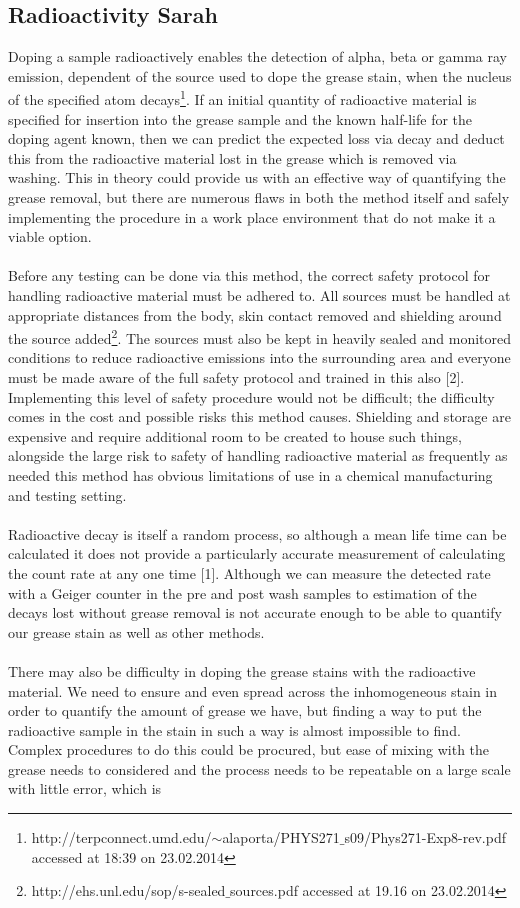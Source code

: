 \documentclass[a4paper ,12pt]{article}
\begin{document}
\subsection{Radioactivity Sarah}
Doping a sample radioactively enables the detection of alpha, beta or gamma ray emission, dependent of the source used to dope the grease stain, when the nucleus of the specified atom decays\footnote{http://terpconnect.umd.edu/$\sim$alaporta/PHYS271$\_$s09/Phys271-Exp8-rev.pdf accessed at 18:39 on 23.02.2014}. If an initial quantity of radioactive material is specified for insertion into the grease sample and the known half-life for the doping agent known, then we can predict the expected loss via decay and deduct this from the radioactive material lost in the grease which is removed via washing.  This in theory could provide us with an effective way of quantifying the grease removal, but there are numerous flaws in both the method itself and safely implementing the procedure in a work place environment that do not make it a viable option.\\\\Before any testing can be done via this method, the correct safety protocol for handling radioactive material must be adhered to.  All sources must be handled at appropriate distances from the body, skin contact removed and shielding around the source added\footnote{http://ehs.unl.edu/sop/s-sealed$\_$sources.pdf accessed at 19.16 on 23.02.2014}. The sources must also be kept in heavily sealed and monitored conditions to reduce radioactive emissions into the surrounding area and everyone must be made aware of the full safety protocol and trained in this also [2]. Implementing this level of safety procedure would not be difficult; the difficulty comes in the cost and possible risks this method causes. Shielding and storage are expensive and require additional room to be created to house such things, alongside the large risk to safety of handling radioactive material as frequently as needed this method has obvious limitations of use in a chemical manufacturing and testing setting.\\\\Radioactive decay is itself a random process, so although a mean life time can be calculated it does not provide a particularly accurate measurement of calculating the count rate at any one time [1]. Although we can measure the detected rate with a Geiger counter in the pre and post wash samples to estimation of the decays lost without grease removal is not accurate enough to be able to quantify our grease stain as well as other methods.\\\\There may also be difficulty in doping the grease stains with the radioactive material. We need to ensure and even spread across the inhomogeneous stain in order to quantify the amount of grease we have, but finding a way to put the radioactive sample in the stain in such a way is almost impossible to find. Complex procedures to do this could be procured, but ease of mixing with the grease needs to considered and the process needs to be repeatable on a large scale with little error, which is 
\end{document}
